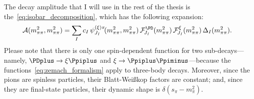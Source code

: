     The decay amplitude that I will use in the rest of the thesis is the~\eqref{eq:isobar_decomposition}, which has the following expansion:
    \begin{equation}
        \A(m_{\pi\pi}^2, m_{\pi\pi}^2) = \sum_{I} c_I \,\psi_{J_I}^{(\xi)\pi}\!(m_{\pi\pi}^2, m_{\pi\pi}^2)\, \mathcal{F}_{\!J_I}^{\PD}(m_{\pi\pi}^2) \, \mathcal{F}_{\!J_I}^{\xi}(m_{\pi\pi}^2)\,\Delta_I(m_{\pi\pi}^2).
    \end{equation}
    Please note that there is only one spin-dependent function for two sub-decays---namely, $\PDplus\to\xi\Ppiplus$ and $\xi\to\Ppiplus\Ppiminus$---because the functions~\eqref{eq:zemach_formalism} apply to three-body decays.
    Moreover, since the pions are spinless particles, their Blatt-Wei\ss{}kop factors are constant; and, since they are final-state particles, their dynamic shape is $\delta(s_{\pi}-m_{\pi}^2)$.
